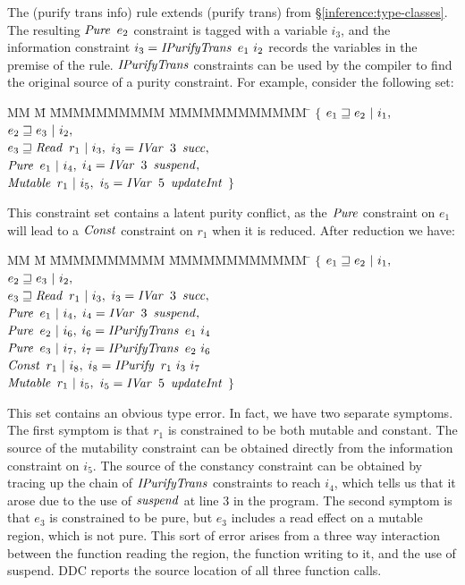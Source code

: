 The (purify trans info) rule extends (purify trans) from \S\ref{inference:type-classes}. The resulting $\operatorname{\mathit{Pure}} \ e_2$ constraint is tagged with a variable $i_3$, and the information constraint $i_3 = \operatorname{\mathit{IPurifyTrans}} \ e_1 \ i_2$ records the variables in the premise of the rule. $\operatorname{\mathit{IPurifyTrans}}$ constraints can be used by the compiler to find the original source of a purity constraint.  For example, consider the following set:
\begin{tabbing}
		MM \=	M 	\= MMMMMMMMMM \= MMMMMMMMMMMM \=  \kill
	\>	$\{$ 	\> $e_1 \sqsupseteq e_2 \ | \ i_1,$ 		
	\\
	\>		\> $e_2 \sqsupseteq e_3 \ | \ i_2,$ 	
	\\
	\>		\> $e_3 \sqsupseteq \operatorname{\mathit{Read}} \ r_1 \ | \ i_3,$ 
			\> $i_3 = \operatorname{\mathit{IVar}} \ 3  \ \operatorname{\mathit{succ}},$ 
	\\
	\> 		\> $\operatorname{\mathit{Pure}} \ e_1 \ | \ i_4,$ 	
			\> $i_4 = \operatorname{\mathit{IVar}} \ 3  \ \operatorname{\mathit{suspend}},$ 
	\\
	\>		\> $\operatorname{\mathit{Mutable}} \ r_1 \ | \ i_5,$
			\> $i_5 = \operatorname{\mathit{IVar}} \ 5 \ \operatorname{\mathit{updateInt}}$
			\> $\}$
\end{tabbing}
This constraint set contains a latent purity conflict, as the $\operatorname{\mathit{Pure}}$ constraint on $e_1$ will lead to a $\operatorname{\mathit{Const}}$ constraint on $r_1$ when it is reduced. After reduction we have:
\begin{tabbing}
	MM \=	M 	\= MMMMMMMMMM \= MMMMMMMMMMMM \=  \kill
	\>	$\{$ 	\> $e_1 \sqsupseteq e_2 \ | \ i_1,$ 		
	\\
	\>		\> $e_2 \sqsupseteq e_3 \ | \ i_2,$ 	
	\\
	\>		\> $e_3 \sqsupseteq \operatorname{\mathit{Read}} \ r_1 \ | \ i_3,$ 
			\> $i_3 = \operatorname{\mathit{IVar}} \ 3  \ \operatorname{\mathit{succ}},$ 
	\\
	\> 		\> $\operatorname{\mathit{Pure}} \ e_1 \ | \ i_4,$ 	
			\> $i_4 = \operatorname{\mathit{IVar}} \ 3  \ \operatorname{\mathit{suspend}},$ 
	\\
	\> 		\> $\operatorname{\mathit{Pure}} \ e_2 \ | \ i_6,$ 	
			\> $i_6 = \operatorname{\mathit{IPurifyTrans}} \ e_1 \ i_4$
	\\
	\> 		\> $\operatorname{\mathit{Pure}} \ e_3 \ | \ i_7,$ 	
			\> $i_7 = \operatorname{\mathit{IPurifyTrans}} \ e_2 \ i_6$
	\\
	\> 		\> $\operatorname{\mathit{Const}} \ r_1 \ | \ i_8,$ 	
			\> $i_8 = \operatorname{\mathit{IPurify}} \ r_1 \ i_3 \ i_7$
	\\
	\>		\> $\operatorname{\mathit{Mutable}} \ r_1 \ | \ i_5,$
			\> $i_5 = \operatorname{\mathit{IVar}} \ 5 \ \operatorname{\mathit{updateInt}}$
			\> $\}$
\end{tabbing}
This set contains an obvious type error. In fact, we have two separate symptoms. The first symptom is that $r_1$ is constrained to be both mutable and constant. The source of the mutability constraint can be obtained directly from the information constraint on $i_5$. The source of the constancy constraint can be obtained by tracing up the chain of $\operatorname{\mathit{IPurifyTrans}}$ constraints to reach $i_4$, which tells us that it arose due to the use of $\operatorname{\mathit{suspend}}$ at line 3 in the program. The second symptom is that $e_3$ is constrained to be pure, but $e_3$ includes a read effect on a mutable region, which is not pure. This sort of error arises from a three way interaction between the function reading the region, the function writing to it, and the use of suspend. DDC reports the source location of all three function calls. 

